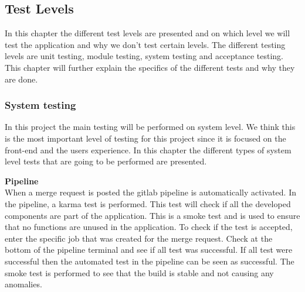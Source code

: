 \subsection{Test Levels}
In this chapter the different test levels are presented and on which level we will test the application and why we don't test certain levels. The different testing levels are unit testing, module testing, system testing and acceptance testing. This chapter will further explain the specifics of the different tests and why they are done.



\subsubsection{System testing}
In this project the main testing will be performed on system level. We think this is the most important level of testing for this project since it is focused on the front-end and the users experience. In this chapter the different types of system level tests that are going to be performed are presented. \newline

\noindent \textbf{Pipeline}\\
When a merge request is posted the gitlab pipeline is automatically activated. In the pipeline, a karma test is performed. This test will check if all the developed components are part of the application. This is a smoke test and is used to ensure that no functions are unused in the application. To check if the test is accepted, enter the specific job that was created for the merge request. Check at the bottom of the pipeline terminal and see if all test was successful. If all test were successful then the automated test in the pipeline can be seen as successful. The smoke test is performed to see that the build is stable and not causing any anomalies.\\ 

